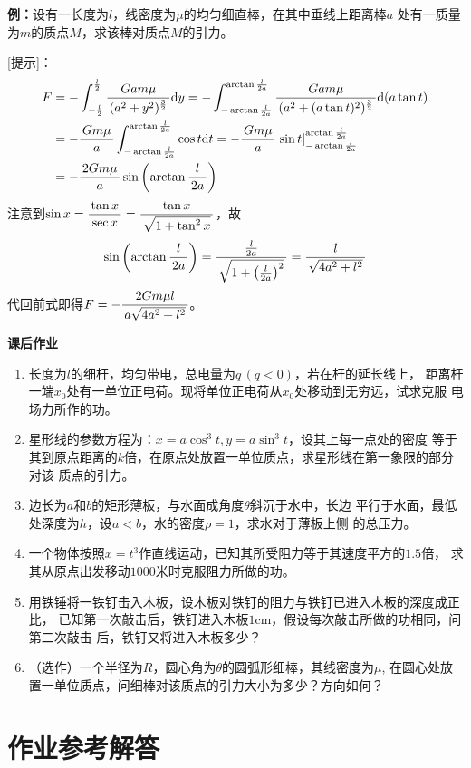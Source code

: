 {\bf 例：}设有一长度为$l$，线密度为$\mu$的均匀细直棒，在其中垂线上距离棒$a$
处有一质量为$m$的质点$M$，求该棒对质点$M$的引力。

[提示]：
\begin{align}
	F&=-\displaystyle\int_{-\frac l2}^{\frac l2}\displaystyle\frac{\,{Gam\mu}\,}{\,{(a^2+y^2)^{\frac32}}\,}\mathrm{d} y
	=-\displaystyle\int_{-\arctan\frac l{2a}}^{\arctan\frac l{2a}}\displaystyle\frac{\,{Gam\mu}\,}{\,{(a^2+(a\tan
	t)^2)^{\frac32}}\,}\mathrm{d} (a\tan t)\notag\\
	&=-\displaystyle\frac{\,{Gm\mu}\,}{\,{a}\,}\displaystyle\int_{-\arctan\frac l{2a}}^{\arctan\frac
	l{2a}}\cos t\mathrm{d} t=-\displaystyle\frac{\,{Gm\mu}\,}{\,{a}\,}\left.\sin t\right|_{-\arctan\frac
	l{2a}}^{\arctan\frac l{2a}}\notag\\
	&=-\displaystyle\frac{\,{2Gm\mu}\,}{\,{a}\,}\sin\left(\arctan\displaystyle\frac{\,{l}\,}{\,{2a}\,}\right)\notag
\end{align}
注意到$\sin x=\displaystyle\frac{\,{\tan x}\,}{\,{\sec x}\,}=\displaystyle\frac{\,{\tan x}\,}{\,{\sqrt{1+\tan^2 x}}\,}$，故
$$\sin\left(\arctan\displaystyle\frac{\,{l}\,}{\,{2a}\,}\right)=\displaystyle\frac{\,{\frac{l}{2a}}\,}{\,{\sqrt{1+\left(\frac{l}{2a}\right)^2}}\,}=\displaystyle\frac{\,{l}\,}{\,{\sqrt{4a^2+l^2}}\,}$$
代回前式即得$F=-\displaystyle\frac{\,{2Gm\mu l}\,}{\,{a\sqrt{4a^2+l^2}}\,}$。

\begin{ext}
	{\bf 课后作业}
	\begin{enumerate}
	  \item 长度为$l$的细杆，均匀带电，总电量为$q\,(q<0)$，若在杆的延长线上，
	  距离杆一端$x_0$处有一单位正电荷。现将单位正电荷从$x_0$处移动到无穷远，试求克服
	  电场力所作的功。
	  \item 星形线的参数方程为：$x=a\cos^3t,y=a\sin^3t$，设其上每一点处的密度
	  等于其到原点距离的$k$倍，在原点处放置一单位质点，求星形线在第一象限的部分对该
	  质点的引力。
	  \item 边长为$a$和$b$的矩形薄板，与水面成角度$\theta$斜沉于水中，长边
	  平行于水面，最低处深度为$h$，设$a<b$，水的密度$\rho=1$，求水对于薄板上侧
	  的总压力。
	  \item 一个物体按照$x=t^3$作直线运动，已知其所受阻力等于其速度平方的$1.5$倍，
	  求其从原点出发移动$1000$米时克服阻力所做的功。
	  \item 用铁锤将一铁钉击入木板，设木板对铁钉的阻力与铁钉已进入木板的深度成正比，
	  已知第一次敲击后，铁钉进入木板$1$cm，假设每次敲击所做的功相同，问第二次敲击
	  后，铁钉又将进入木板多少？
	  \item （选作）一个半径为$R$，圆心角为$\theta$的圆弧形细棒，其线密度为$\mu$,
	  在圆心处放置一单位质点，问细棒对该质点的引力大小为多少？方向如何？
	\end{enumerate}
\end{ext}

\newpage

\section*{作业参考解答}

